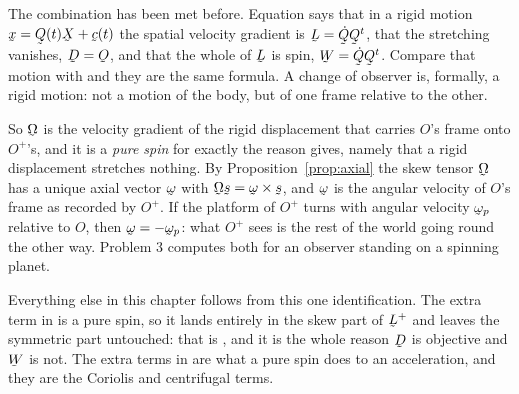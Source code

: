 \begin{remark}\label{rem:ch7omega}
The combination has been met before. Equation  says that in a
rigid motion $\bx=\bQ(t)\bX+\bc(t)$ the spatial velocity gradient is
$\bL=\dot\bQ\bQ^{t}$, that the stretching vanishes, $\bD=\Ob$, and that
the whole of $\bL$ is spin, $\bW=\dot\bQ\bQ^{t}$. Compare that motion
with  and they are the same formula. A change of observer is,
formally, a rigid motion: not a motion of the body, but of one frame
relative to the other.

So $\bOm$ is the velocity gradient of the rigid displacement that carries
$O$'s frame onto $O^{+}$'s, and it is a \emph{pure spin} for exactly the
reason  gives, namely that a rigid displacement stretches
nothing. By Proposition~\ref{prop:axial} the skew tensor $\bOm$ has a
unique axial vector $\bom$ with $\bOm\bs=\bom\times\bs$, and $\bom$ is
the angular velocity of $O$'s frame as recorded by $O^{+}$. If the
platform of $O^{+}$ turns with angular velocity $\bom_{p}$ relative to
$O$, then $\bom=-\bom_{p}$: what $O^{+}$ sees is the rest of the world
going round the other way. Problem 3 computes both for an observer
standing on a spinning planet.

Everything else in this chapter follows from this one identification. The
extra term in  is a pure spin, so it lands entirely in the skew
part of $\bL^{+}$ and leaves the symmetric part untouched: that is
, and it is the whole reason $\bD$ is objective and $\bW$ is
not. The extra terms in  are what a pure spin does to an
acceleration, and they are the Coriolis and centrifugal terms.
\end{remark}

